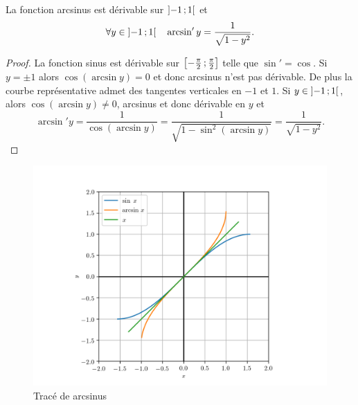%
\begin{prop}
  La fonction arcsinus est dérivable sur \(\left] -1 \, ;  1 \right[\) et
  \begin{equation}
    \forall y \in \left] -1 \, ;  1 \right[ \quad \arcsin'y = \frac{1}{\sqrt{1-y^2}}.
  \end{equation}
\end{prop}
\begin{proof}
  La fonction sinus est dérivable sur \(\left[ -\frac{\pi}{2} \, ;  \frac{\pi}{2} \right]\) telle que \(\sin'=\cos\). Si \(y=\pm 1\) alors \(\cos(\arcsin y)=0\) et donc arcsinus n'est pas dérivable. De plus la courbe représentative admet des tangentes verticales en \(-1\) et \(1\). Si \(y \in \left] -1 \, ;  1 \right[\), alors \(\cos(\arcsin y) \neq 0\), arcsinus et donc dérivable en \(y\) et
  \begin{equation}
    \arcsin' y = \frac{1}{\cos( \arcsin y)}=\frac{1}{\sqrt{1-\sin^2(\arcsin y)}}=\frac{1}{\sqrt{1-y^2}}.
  \end{equation}
\end{proof}
\begin{figure}
  \centering
  \includegraphics[scale=0.6]{arcsin.png}
  \caption{Tracé de arcsinus}
  \label{fig:tracearcsinus}
\end{figure}
%
